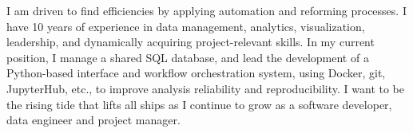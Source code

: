 \smallskip
{} 

\begin{cvparagraph}
\smallskip
I am driven to find efficiencies by applying automation and reforming
processes. I have 10 years of experience in data management, analytics,
visualization, leadership, and dynamically acquiring project-relevant skills.
In my current position, I manage a shared SQL database, and lead the development
of a Python-based interface and workflow orchestration system, using Docker,
git, JupyterHub, etc., to improve analysis reliability and reproducibility. 
\smallskip I want to be the rising tide that lifts all ships as I
continue to grow as a software developer, data engineer and project manager.
\end{cvparagraph}

